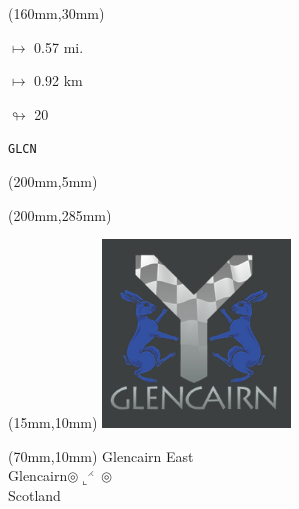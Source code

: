 \begin{textblock*}{40mm}(160mm,30mm)%
\Large
\par$\mapsto$ 0.57 mi.
\par$\mapsto$ 0.92 km
\par$\looparrowright$ 20
\par\hfill\tiny\tt GLCN\\
\end{textblock*}
\begin{textblock*}{20mm}(200mm,5mm)%
\fbox{\thepage}
\label{GLCN}
\end{textblock*}
\begin{textblock*}{20mm}(200mm,285mm)%
\fbox{\thepage}
\end{textblock*}

\null\newpage
\begin{textblock*}{50mm}(15mm,10mm)%
\includegraphics[width=50mm]{LG/GLCN.png}
\end{textblock*}
\begin{textblock*}{130mm}(70mm,10mm)%
{\fontsize{20}{20}\selectfont Glencairn East\\}
{\fontsize{16}{16}\selectfont Glencairn\hfill $\circledcirc\llcorner^{\rightthreetimes}\circledcirc$\\}
{\fontsize{12}{12}\selectfont Scotland\\}
\end{textblock*}
